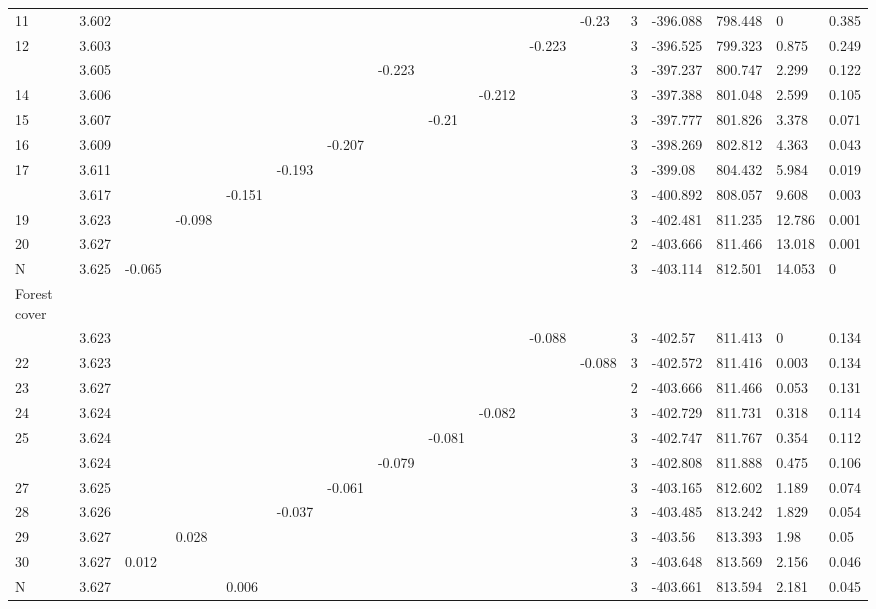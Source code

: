 \documentclass[
	12pt,				%
	oneside,			%
	a4paper,			%
	chapter=TITLE,		%
	section=TITLE,		%
	brazil,			%
	english				%
	]{abntex2}
\begin{document}
\begin{table}[!h]
{\begin{tabular}[t]{lllllllllllllllll}
11 & 3.602 &  &  &  &  &  &  &  &  &  & -0.23 & 3 & -396.088 & 798.448 & 0 & 0.385\\
12 & 3.603 &  &  &  &  &  &  &  &  & -0.223 &  & 3 & -396.525 & 799.323 & 0.875 & 0.249\\
\addlinespace
13 & 3.605 &  &  &  &  &  & -0.223 &  &  &  &  & 3 & -397.237 & 800.747 & 2.299 & 0.122\\
14 & 3.606 &  &  &  &  &  &  &  & -0.212 &  &  & 3 & -397.388 & 801.048 & 2.599 & 0.105\\
15 & 3.607 &  &  &  &  &  &  & -0.21 &  &  &  & 3 & -397.777 & 801.826 & 3.378 & 0.071\\
16 & 3.609 &  &  &  &  & -0.207 &  &  &  &  &  & 3 & -398.269 & 802.812 & 4.363 & 0.043\\
17 & 3.611 &  &  &  & -0.193 &  &  &  &  &  &  & 3 & -399.08 & 804.432 & 5.984 & 0.019\\
\addlinespace
18 & 3.617 &  &  & -0.151 &  &  &  &  &  &  &  & 3 & -400.892 & 808.057 & 9.608 & 0.003\\
19 & 3.623 &  & -0.098 &  &  &  &  &  &  &  &  & 3 & -402.481 & 811.235 & 12.786 & 0.001\\
20 & 3.627 &  &  &  &  &  &  &  &  &  &  & 2 & -403.666 & 811.466 & 13.018 & 0.001\\
N & 3.625 & -0.065 &  &  &  &  &  &  &  &  &  & 3 & -403.114 & 812.501 & 14.053 & 0\\
Forest cover &  &  &  &  &  &  &  &  &  &  &  &  &  &  &  & \\
\addlinespace
21 & 3.623 &  &  &  &  &  &  &  &  & -0.088 &  & 3 & -402.57 & 811.413 & 0 & 0.134\\
22 & 3.623 &  &  &  &  &  &  &  &  &  & -0.088 & 3 & -402.572 & 811.416 & 0.003 & 0.134\\
23 & 3.627 &  &  &  &  &  &  &  &  &  &  & 2 & -403.666 & 811.466 & 0.053 & 0.131\\
24 & 3.624 &  &  &  &  &  &  &  & -0.082 &  &  & 3 & -402.729 & 811.731 & 0.318 & 0.114\\
25 & 3.624 &  &  &  &  &  &  & -0.081 &  &  &  & 3 & -402.747 & 811.767 & 0.354 & 0.112\\
\addlinespace
26 & 3.624 &  &  &  &  &  & -0.079 &  &  &  &  & 3 & -402.808 & 811.888 & 0.475 & 0.106\\
27 & 3.625 &  &  &  &  & -0.061 &  &  &  &  &  & 3 & -403.165 & 812.602 & 1.189 & 0.074\\
28 & 3.626 &  &  &  & -0.037 &  &  &  &  &  &  & 3 & -403.485 & 813.242 & 1.829 & 0.054\\
29 & 3.627 &  & 0.028 &  &  &  &  &  &  &  &  & 3 & -403.56 & 813.393 & 1.98 & 0.05\\
30 & 3.627 & 0.012 &  &  &  &  &  &  &  &  &  & 3 & -403.648 & 813.569 & 2.156 & 0.046\\
\addlinespace
N & 3.627 &  &  & 0.006 &  &  &  &  &  &  &  & 3 & -403.661 & 813.594 & 2.181 & 0.045\\
\bottomrule
\end{tabular}}
\end{table}
\end{document}

